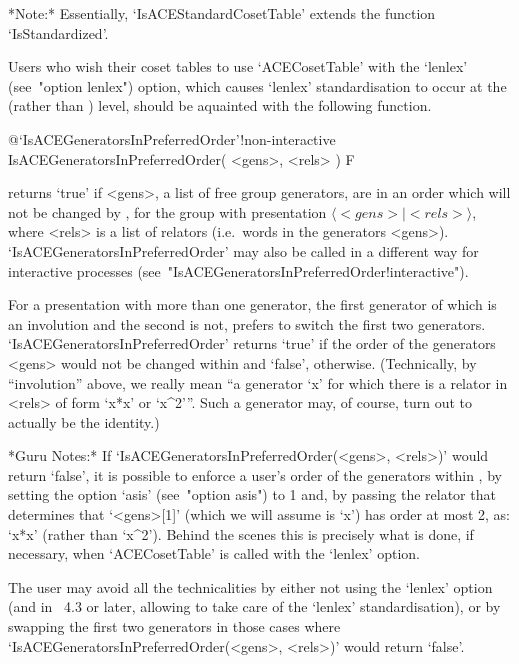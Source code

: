 *Note:*
Essentially, `IsACEStandardCosetTable'  extends  the  {\GAP}  function
`IsStandardized'.

Users who wish their coset tables  to  use  `ACECosetTable'  with  the
`lenlex'    (see~"option     lenlex")     option,     which     causes
`lenlex' standardisation to occur at the {\ACE} (rather  than  {\GAP})
level, should be aquainted with the following function.

%
{@\noexpand`IsACEGeneratorsInPreferredOrder'!non-interactive}
\>IsACEGeneratorsInPreferredOrder( <gens>, <rels> ) F

returns `true' if <gens>, a list of free group generators, are  in  an
order which will  not  be  changed  by  {\ACE},  for  the  group  with
presentation $\langle <gens> \mid <rels>\rangle$, where  <rels>  is  a
list   of   relators   (i.e.~words   in   the   generators    <gens>).
`IsACEGeneratorsInPreferredOrder' may also be called  in  a  different
way         for         interactive          {\ACE}          processes
(see~"IsACEGeneratorsInPreferredOrder!interactive").

For a presentation with more than one generator, the  first  generator
of which is an involution and the second is  not,  {\ACE}  prefers  to
switch the  first  two  generators.  `IsACEGeneratorsInPreferredOrder'
returns `true' if the order of the  generators  <gens>  would  not  be
changed  within  {\ACE}  and  `false',  otherwise.  (Technically,   by
``involution'' above, we really mean ``a generator `x' for which there
is a relator in <rels> of form `x*x' or `x^2'''. Such a generator may,
of course, turn out to actually be the identity.)

*Guru Notes:*
If  `IsACEGeneratorsInPreferredOrder(<gens>,  <rels>)'  would   return
`false', it is possible to enforce a user's order  of  the  generators
within {\ACE}, by setting the option `asis' (see~"option asis")  to  1
and, by passing the relator that determines that `<gens>[1]' (which we
will assume is `x') has order  at  most  2,  as:  `x*x'  (rather  than
`x^2').  Behind  the  scenes  this  is  precisely  what  is  done,  if
necessary, when `ACECosetTable' is called with the `lenlex' option.

The user may avoid all the technicalities  by  either  not  using  the
`lenlex' option (and in {\GAP}~4.3 or later, allowing {\GAP}  to  take
care of the `lenlex' standardisation), or by swapping  the  first  two
generators          in           those           cases           where
`IsACEGeneratorsInPreferredOrder(<gens>,   <rels>)'    would    return
`false'.

